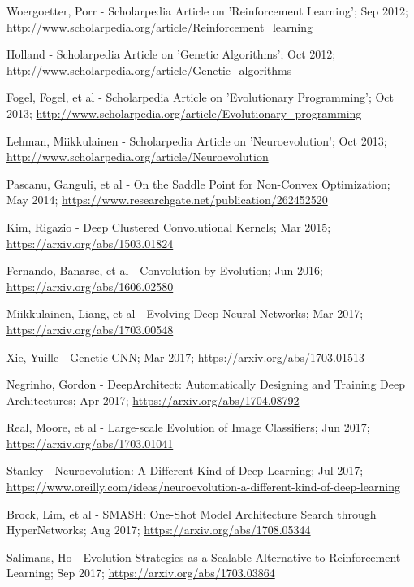 \documentclass[journal, a4paper]{IEEEtran}
\begin{document}
\begin{thebibliography}{5}
    Woergoetter, Porr - Scholarpedia Article on 'Reinforcement Learning'; Sep 2012;
    \url{http://www.scholarpedia.org/article/Reinforcement_learning}

    Holland - Scholarpedia Article on 'Genetic Algorithms'; Oct 2012;
    \url{http://www.scholarpedia.org/article/Genetic_algorithms}

    Fogel, Fogel, et al - Scholarpedia Article on 'Evolutionary Programming'; Oct 2013;
    \url{http://www.scholarpedia.org/article/Evolutionary_programming}

    Lehman, Miikkulainen - Scholarpedia Article on 'Neuroevolution'; Oct 2013;
    \url{http://www.scholarpedia.org/article/Neuroevolution}

    Pascanu, Ganguli, et al - On the Saddle Point for Non-Convex Optimization; May 2014;
    \url{https://www.researchgate.net/publication/262452520}

    Kim, Rigazio - Deep Clustered Convolutional Kernels; Mar 2015;
    \url{https://arxiv.org/abs/1503.01824}

    Fernando, Banarse, et al - Convolution by Evolution; Jun 2016;
    \url{https://arxiv.org/abs/1606.02580}

    Miikkulainen, Liang, et al - Evolving Deep Neural Networks; Mar 2017;
    \url{https://arxiv.org/abs/1703.00548}

    Xie, Yuille - Genetic CNN; Mar 2017;
    \url{https://arxiv.org/abs/1703.01513}

    Negrinho, Gordon - DeepArchitect: Automatically Designing and Training Deep Architectures; Apr 2017;
    \url{https://arxiv.org/abs/1704.08792}

    Real, Moore, et al - Large-scale Evolution of Image Classifiers; Jun 2017;
    \url{https://arxiv.org/abs/1703.01041}

    Stanley - Neuroevolution: A Different Kind of Deep Learning; Jul 2017;
    \url{https://www.oreilly.com/ideas/neuroevolution-a-different-kind-of-deep-learning}

    Brock, Lim, et al - SMASH: One-Shot Model Architecture Search through HyperNetworks; Aug 2017;
    \url{https://arxiv.org/abs/1708.05344}

    Salimans, Ho - Evolution Strategies as a Scalable Alternative to Reinforcement Learning; Sep 2017;
    \url{https://arxiv.org/abs/1703.03864}


\end{thebibliography}
\end{document}
